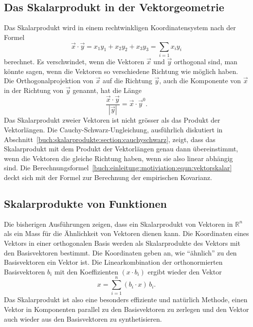 %
%
\subsection{Das Skalarprodukt in der Vektorgeometrie}
Das Skalarprodukt wird in einem rechtwinkligen Koordinatensystem nach der
Formel
\begin{equation}
\vec{x}\cdot\vec{y} = x_1y_1 + x_2y_2 + x_3y_3 = \sum_{i=1} x_iy_i
\label{buch:einleitung:motiviation:equn:vektorskalar}
\end{equation}
berechnet.
Es verschwindet, wenn die Vektoren $\vec{x}$ und $\vec{y}$ orthogonal
sind, man könnte sagen,
wenn die Vektoren so verschiedene Richtung wie möglich haben.
Die Orthogonalprojektion von $\vec{x}$ auf die Richtung $\vec{y}$,
%
auch die Komponente von $\vec{x}$ in der Richtung von $\vec{y}$ genannt,
hat die Länge 
\[
\frac{\vec{x}\cdot\vec{y}}{|\vec{y}|}
=
\vec{x}\cdot \vec{y}^0.
\]
Das Skalarprodukt zweier Vektoren ist nicht grösser als das Produkt
der Vektorlängen.
Die Cauchy-Schwarz-Ungleichung, ausführlich diskutiert in
%
Abschnitt~\ref{buch:skalarprodukte:section:cauchyschwarz},
zeigt, dass das Skalarprodukt mit dem Produkt der Vektorlängen
genau dann übereinstimmt, wenn die Vektoren die gleiche Richtung
haben, wenn sie also linear abhängig sind.
Die Berechnungsformel~\eqref{buch:einleitung:motiviation:equn:vektorskalar}
deckt sich mit der Formel zur Berechnung der empirischen Kovarianz.

%
%
\subsection{Skalarprodukte von Funktionen}
Die bisherigen Ausführungen zeigen, dass ein Skalarprodukt von
Vektoren in $\mathbb{R}^n$ als ein Mass für die Ähnlichkeit von Vektoren
dienen kann. 
Die Koordinaten eines Vektors in einer orthogonalen Basis werden
als Skalarprodukte des Vektors mit den Basisvektoren bestimmt.
Die Koordinaten geben an, wie ``ähnlich'' zu den Basisvektoren ein Vektor
ist.
Die Linearkombination der orthonormierten Basisvektoren $b_i$ mit den
Koeffizienten $(x\cdot b_i)$ ergibt wieder den Vektor 
\[
x = \sum_{i=1}^n (b_i\cdot x) \, b_i.
\]
Das Skalarprodukt ist also eine besonders effiziente und natürlich
Methode, einen Vektor in Komponenten parallel zu den Basisvektoren
zu zerlegen und den Vektor auch wieder aus den Basisvektoren zu
synthetisieren.

